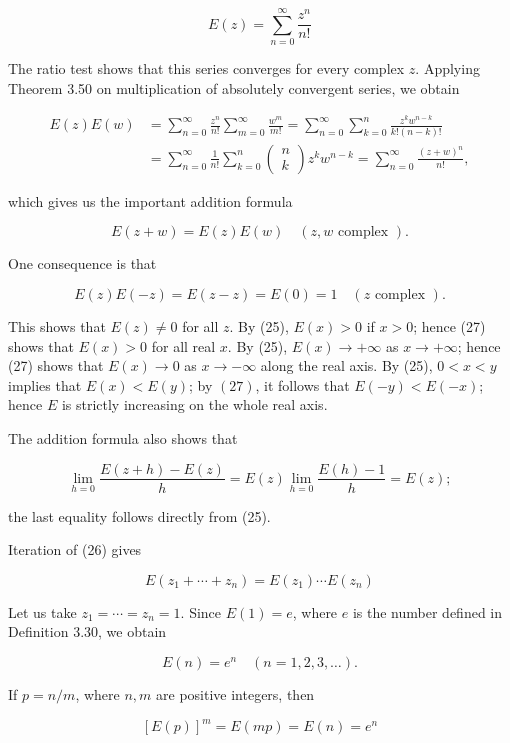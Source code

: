 \documentclass[10pt]{article}
\begin{document}
$$
E(z)=\sum_{n=0}^{\infty} \frac{z^{n}}{n !}
$$

The ratio test shows that this series converges for every complex $z$. Applying Theorem 3.50 on multiplication of absolutely convergent series, we obtain

$$
\begin{aligned}
E(z) E(w) & =\sum_{n=0}^{\infty} \frac{z^{n}}{n !} \sum_{m=0}^{\infty} \frac{w^{m}}{m !}=\sum_{n=0}^{\infty} \sum_{k=0}^{n} \frac{z^{k} w^{n-k}}{k !(n-k) !} \\
& =\sum_{n=0}^{\infty} \frac{1}{n !} \sum_{k=0}^{n}\left(\begin{array}{l}
n \\
k
\end{array}\right) z^{k} w^{n-k}=\sum_{n=0}^{\infty} \frac{(z+w)^{n}}{n !},
\end{aligned}
$$

which gives us the important addition formula

$$
E(z+w)=E(z) E(w) \quad(z, w \text { complex }) .
$$

One consequence is that

$$
E(z) E(-z)=E(z-z)=E(0)=1 \quad(z \text { complex }) .
$$

This shows that $E(z) \neq 0$ for all $z$. By (25), $E(x)>0$ if $x>0$; hence (27) shows that $E(x)>0$ for all real $x$. By (25), $E(x) \rightarrow+\infty$ as $x \rightarrow+\infty$; hence (27) shows that $E(x) \rightarrow 0$ as $x \rightarrow-\infty$ along the real axis. By (25), $0<x<y$ implies that $E(x)<E(y)$; by $(27)$, it follows that $E(-y)<E(-x)$; hence $E$ is strictly increasing on the whole real axis.

The addition formula also shows that

$$
\lim _{h=0} \frac{E(z+h)-E(z)}{h}=E(z) \lim _{h=0} \frac{E(h)-1}{h}=E(z) ;
$$

the last equality follows directly from (25).

Iteration of (26) gives

$$
E\left(z_{1}+\cdots+z_{n}\right)=E\left(z_{1}\right) \cdots E\left(z_{n}\right)
$$

Let us take $z_{1}=\cdots=z_{n}=1$. Since $E(1)=e$, where $e$ is the number defined in Definition 3.30, we obtain

$$
E(n)=e^{n} \quad(n=1,2,3, \ldots) .
$$

If $p=n / m$, where $n, m$ are positive integers, then

$$
[E(p)]^{m}=E(m p)=E(n)=e^{n}
$$
\end{document}
